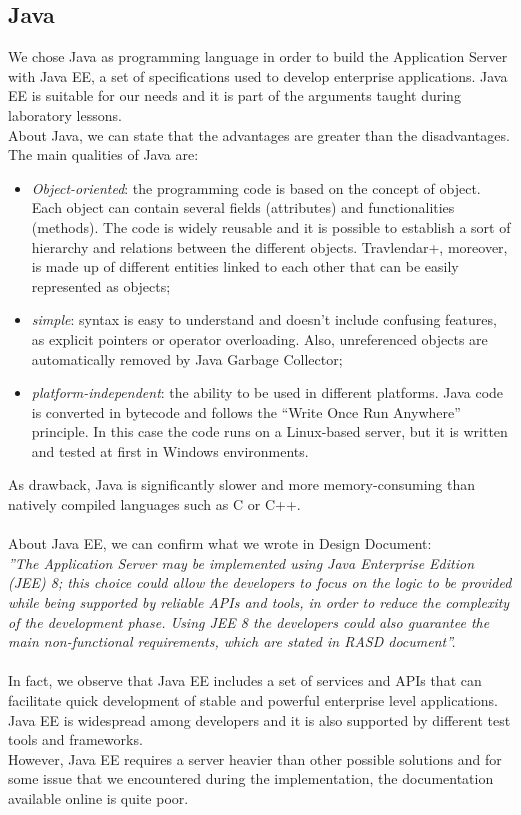 \subsection{Java}
\label{subsect:Java}
We chose Java as programming language in order to build the Application Server with Java EE, a set of specifications used to develop enterprise applications. Java EE is suitable for our needs and it is part of the arguments taught during laboratory lessons.\\
About Java, we can state that the advantages are greater than the disadvantages. The main qualities of Java are:
\begin{itemize}
\item \textit{Object-oriented}: the programming code is based on the concept of object. Each object can contain several fields (attributes) and functionalities (methods). The code is widely reusable and it is possible to establish a sort of hierarchy and relations between the different objects. Travlendar+, moreover, is made up of different entities linked to each other that can be easily represented as objects;
\item \textit{simple}: syntax is easy to understand and doesn’t include confusing features, as explicit pointers or operator overloading. Also, unreferenced objects are automatically removed by Java Garbage Collector;
\item \textit{platform-independent}: the ability to be used in different platforms. Java code is converted in bytecode and follows the “Write Once Run Anywhere” principle. In this case the code runs on a Linux-based server, but it is written and tested at first in Windows environments. 
\end{itemize}
As drawback, Java is significantly slower and more memory-consuming than natively compiled languages such as C or C++.\\\\
About Java EE, we can confirm what we wrote in Design Document:\\
\textit{''The Application Server may be implemented using Java Enterprise Edition (JEE) 8; this choice could allow the developers to focus on the logic to be provided while being supported by reliable APIs and tools, in order to reduce the complexity of the development phase. Using JEE 8 the developers could also guarantee the main non-functional requirements, which are stated in RASD document''.}\\\\
In fact, we observe that Java EE includes a set of services and APIs that can facilitate quick development of stable and powerful enterprise level applications. Java EE is widespread among developers and it is also supported by different test tools and frameworks.\\
However, Java EE requires a server heavier than other possible solutions and for some issue that we encountered during the implementation, the documentation available online is quite poor. 
